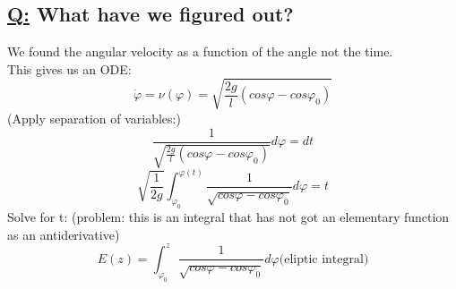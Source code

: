 \documentclass[a4paper, 12pt]{article}
\begin{document}
\subsection{\underline{Q:} What have we figured out?}
We found the angular velocity as a function of the angle not the time.\\
This gives us an ODE: $$\dot{\varphi} = \nu(\varphi) = \sqrt{\frac{2g}{l}(cos \varphi - cos \varphi_0)}$$
(Apply separation of variables:)$$\frac{1}{\sqrt{\frac{2g}{l}(cos \varphi - cos \varphi_0)}} d \varphi = dt$$
$$\sqrt{\frac{1}{2g}} \int_{\varphi_0}^{\varphi(t)} \frac{1}{\sqrt{cos \varphi - cos \varphi_0}} d \varphi = t$$
Solve for t: (problem: this is an integral that has not got an elementary function as an antiderivative)\\
$$E(z) = \int_{\varphi_0}^{z} \frac{1}{\sqrt{cos \varphi - cos \varphi_0}} d \varphi \text{(eliptic integral)}$$
\end{document}
